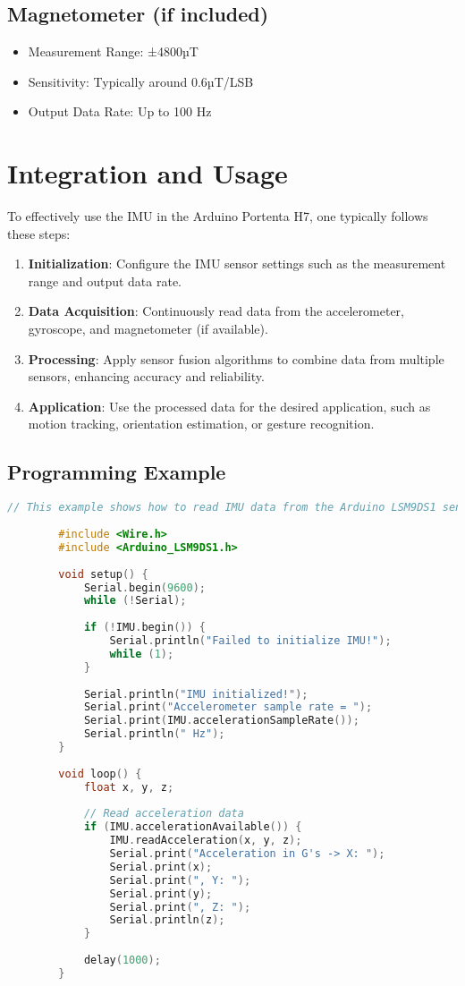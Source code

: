 	\subsection{Magnetometer (if included)}
	\begin{itemize}
		\item Measurement Range: ±4800µT
		\item Sensitivity: Typically around 0.6µT/LSB
		\item Output Data Rate: Up to 100 Hz
	\end{itemize}
	
	\section{Integration and Usage}
	To effectively use the IMU in the Arduino Portenta H7, one typically follows these steps:
	\begin{enumerate}
		\item \textbf{Initialization}: Configure the IMU sensor settings such as the measurement range and output data rate.
		\item \textbf{Data Acquisition}: Continuously read data from the accelerometer, gyroscope, and magnetometer (if available).
		\item \textbf{Processing}: Apply sensor fusion algorithms to combine data from multiple sensors, enhancing accuracy and reliability.
		\item \textbf{Application}: Use the processed data for the desired application, such as motion tracking, orientation estimation, or gesture recognition.
	\end{enumerate}
	
	
	
	\subsection{Programming Example}
	
	\begin{lstlisting}[language=C++, caption=Arduino IMU Example, label=lst:arduino_imu_example]
		// This example shows how to read IMU data from the Arduino LSM9DS1 sensor
		
		#include <Wire.h>
		#include <Arduino_LSM9DS1.h>
		
		void setup() {
			Serial.begin(9600);
			while (!Serial);
			
			if (!IMU.begin()) {
				Serial.println("Failed to initialize IMU!");
				while (1);
			}
			
			Serial.println("IMU initialized!");
			Serial.print("Accelerometer sample rate = ");
			Serial.print(IMU.accelerationSampleRate());
			Serial.println(" Hz");
		}
		
		void loop() {
			float x, y, z;
			
			// Read acceleration data
			if (IMU.accelerationAvailable()) {
				IMU.readAcceleration(x, y, z);
				Serial.print("Acceleration in G's -> X: ");
				Serial.print(x);
				Serial.print(", Y: ");
				Serial.print(y);
				Serial.print(", Z: ");
				Serial.println(z);
			}
			
			delay(1000);
		}
	\end{lstlisting}
	
	
